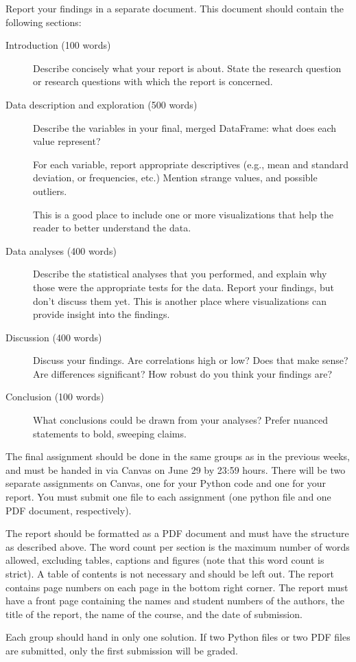 \documentclass[a4paper]{report}
\theoremstyle{definition}
\begin{document}
Report your findings in a separate document. This document should contain
the following sections:

\begin{description}
\item[Introduction (100 words)]
	Describe concisely what your report is about. State the research
	question
	or research questions with which the report is concerned.

\item[Data description and exploration (500 words)]
	Describe the variables in your final, merged DataFrame: what does each
	value represent?

	For each variable, report appropriate descriptives (e.g., mean and
	standard deviation, or frequencies, etc.) Mention strange values, and
	possible outliers.

	This is a good place to include one or more visualizations that help the
	reader to better understand the data.

\item[Data analyses (400 words)]

	Describe the statistical analyses that you performed, and explain why
	those were the appropriate tests for the data. Report your findings,
	but don't discuss them yet. This is another place where visualizations can provide insight into the findings.

\item[Discussion (400 words)]

	Discuss your findings. Are correlations high or low? Does that make sense? Are differences significant? How robust do you think your findings are?

\item[Conclusion (100 words)]

	What conclusions could be drawn from your analyses? Prefer nuanced statements to bold, sweeping claims.

\end{description}

The final assignment should be done in the same groups as in the
previous weeks, and must be handed in via Canvas on June 29 by
23:59 hours. There will be two separate assignments on Canvas, one
for your Python code and one for your report. You must submit one file
to each assignment (one python file and one PDF document, respectively).

The report should be formatted as a PDF document and must have the
structure as described above. The word count per section is the maximum
number of words allowed, excluding tables, captions and figures (note
that this word count is strict). A table of contents is not necessary
and should be left out. The report contains page numbers on each page
in the bottom right corner. The report must have a front page containing
the names and student numbers of the authors, the title of the report,
the name of the course, and the date of submission.

Each group should hand in only one solution. If two Python files or two
PDF files are submitted, only the first submission will be graded.
\end{document}
